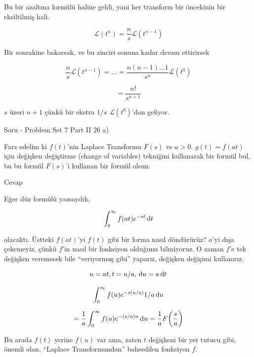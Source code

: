\documentclass[12pt,fleqn]{article}\usepackage{../../common}
\begin{document}
Bu bir azaltma formülü haline geldi, yani her transform bir öncekinin bir
eksiltilmiş hali. 

$$ \mathcal{L} (t^n) = \frac{n}{s} \mathcal{L} (t^{n-1}) 
 $$

Bir sonrakine bakarsak, ve bu zinciri sonuna kadar devam ettirirsek

$$ \frac{n}{s} \mathcal{L} (t^{n-1}) = ... = 
\frac{n(n-1)...1 }{s^n}\mathcal{L}(t^0)
 $$

$$ = \frac{n!}{s^{n+1}} $$

$s$ üzeri $n+1$ çünkü bir ekstra $1/s$ $\mathcal{L} (t^0)$'dan geliyor. 

Soru - Problem Set 7 Part II 26 a) 

Farz edelim ki $f(t)$'nin Laplace Transformu $F(s)$ ve $a > 0$. $g(t) =
f(at)$ için değişken değiştirme (change of variables) tekniğini kullanarak bir formül
bul, bu bu formül $F(s)$'i kullanan bir formül olsun. 

Cevap 

Eğer düz formülü yazsaydık, 

$$ \int_{ 0}^{\infty} f(at) e^{ -st} \,\mathrm{d} t $$

olacaktı. Üstteki $f(at)$'yi $f(t)$ gibi bir forma nasıl döndürürüz? $a$'yi
dışa çekemeyiz, çünkü $f$'in nasıl bir fonksiyon olduğunu bilmiyoruz. O
zaman $f$'e tek değişken veremesek bile ``veriyormuş gibi'' yaparız,
değişken değişimi kullanırız. 

$$ u=at, t = u/a, \,\mathrm{d} u=a \,\mathrm{d} t $$

$$ \int_{ 0}^{\infty} f(u) e^{ -s(u/a)} 1/a \,\mathrm{d} u $$

$$
= \frac{ 1}{a}\int_{ 0}^{\infty} f(u) e^{ -(s/a)u} \,\mathrm{d} u  = 
\frac{ 1}{a}F \bigg(\frac{ s}{a} \bigg)
$$

Bu arada $f(t)$ yerine $f(u)$ var ama, zaten $t$ değişkeni bir yer tutucu
gibi, önemli olan, ``Laplace Transformundan'' bahsedilen fonksiyon $f$. 
\end{document}
